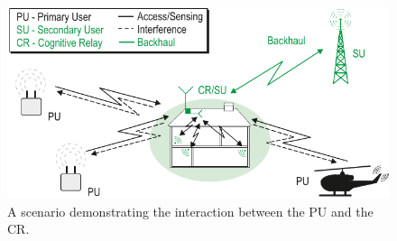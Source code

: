 



\begin{figure}[htb]
	\centering
		\includegraphics[width = \columnwidth]{../kapitel02/figures/wo_channels_CR_Scenario_farbig_general}
	\caption{A scenario demonstrating the interaction between the PU and the CR.}
	\label{fig:dsp_market_share}
\end{figure}

